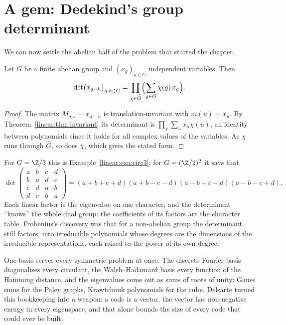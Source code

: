 \section{A gem: Dedekind's group determinant}

We can now settle the abelian half of the problem that started the chapter.

\begin{theorem}[Dedekind]\label{linear:thm:groupdet}
Let $G$ be a finite abelian group and $(x_g)_{g\in G}$ independent variables. Then
\[
\det\bigl(x_{g-h}\bigr)_{g,h\in G}=\prod_{\chi\in\widehat G}\Bigl(\sum_{g\in G}\chi(g)\,x_g\Bigr).
\]
\end{theorem}
\begin{proof}
The matrix $M_{g,h}=x_{g-h}$ is translation-invariant with $m(u)=x_u$. By Theorem~\ref{linear:thm:invariant} its determinant is
$\prod_\chi\sum_ux_u\overline{\chi(u)}$, an identity between polynomials since it holds for all complex values of the
variables. As $\chi$ runs through $\widehat G$, so does $\bar\chi$, which gives the stated form.
\end{proof}

For $G=\Z/3$ this is Example~\ref{linear:exa:circ3}; for $G=(\Z/2)^2$ it says that
\[
\det\begin{pmatrix}a&b&c&d\\b&a&d&c\\c&d&a&b\\d&c&b&a\end{pmatrix}=(a+b+c+d)(a+b-c-d)(a-b+c-d)(a-b-c+d).
\]
Each linear factor is the eigenvalue on one character, and the determinant ``knows'' the whole dual group: the coefficients of
its factors are the character table. Frobenius's discovery was that for a non-abelian group the determinant still factors, into
irreducible polynomials whose degrees are the dimensions of the irreducible representations, each raised to the power of its own
degree.

\begin{beauty}
One basis serves every symmetric problem at once. The discrete Fourier basis diagonalises every circulant, the Walsh--Hadamard
basis every function of the Hamming distance, and the eigenvalues come out as sums of roots of unity: Gauss sums for the Paley
graphs, Krawtchouk polynomials for the cube. Delsarte turned this bookkeeping into a weapon: a code is a vector, the vector has
non-negative energy in every eigenspace, and that alone bounds the size of every code that could ever be built.
\end{beauty}

